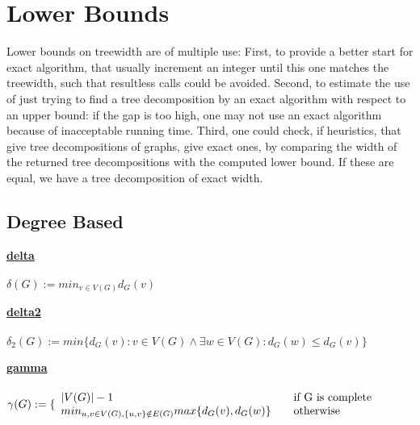\documentclass[a4wide]{article}
\begin{document}
\newpage

\section{Lower Bounds}

Lower bounds on treewidth are of multiple use: First, to provide a better start for exact algorithm, that usually increment an integer until this one matches the treewidth, such that resultless calls could be avoided. Second, to estimate the use of just trying to find a tree decomposition by an exact algorithm with respect to an upper bound: if the gap is too high, one may not use an exact algorithm because of inacceptable running time. Third, one could check, if heuristics, that give tree decompositions of graphs, give exact ones, by comparing the width of the returned tree decompositions with the computed lower bound. If these are equal, we have a tree decomposition of exact width. \\

\subsection{Degree Based}

\underline{\textbf{delta}} \cite{B_lb_db} \\ \\
$\delta(G) := min_{v \in V(G)}d_{G}(v)$ \\

\vspace*{2mm}


\underline{\textbf{delta2}} \cite{B_lb_db} \\ \\
$\delta_{2}(G) := min \{ d_{G}(v) : v \in V(G) \land \exists w \in V(G) : d_{G}(w) \leq d_{G}(v) \}$ \\

\vspace*{2mm}


\underline{\textbf{gamma}} \cite{B_lb_db} \\ \\


$ \gamma (G) := \{ 
  \begin{array}{l l}
    |V(G)| -1  & \quad \text{if G is complete}\\
    min_{u,v \in V(G), \{u,v \} \notin E(G)} max \{ d_{G}(v), d_{G}(w) \} & \quad \text{otherwise}
  \end{array}$ \\
  
\end{document}

